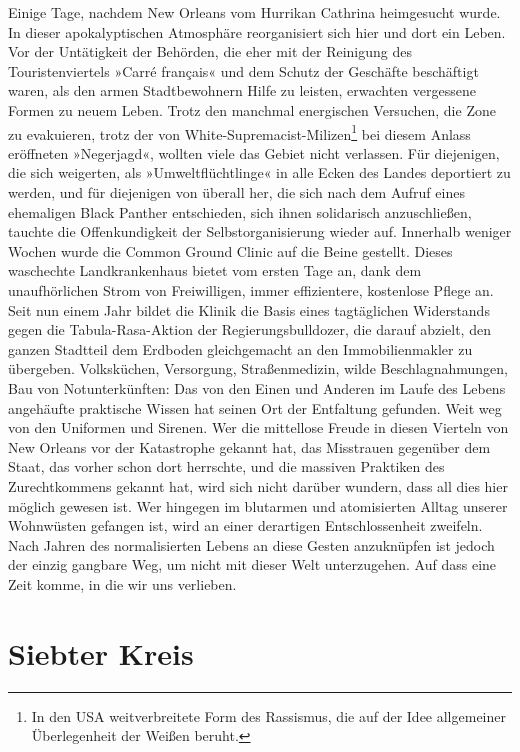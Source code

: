 Einige Tage, nachdem New Orleans vom Hurrikan Cathrina heimgesucht
wurde. In dieser apokalyptischen Atmosphäre reorganisiert sich hier
und dort ein Leben. Vor der Untätigkeit der Behörden, die eher mit
der Reinigung des Touristenviertels »Carré français« und dem Schutz
der Geschäfte beschäftigt waren, als den armen Stadtbewohnern Hilfe
zu leisten, erwachten vergessene Formen zu neuem Leben. Trotz den
manchmal energischen Versuchen, die Zone zu evakuieren, trotz der
von White-Supremacist-Milizen\footnote{
In den USA weitverbreitete Form des Rassismus, die auf der Idee
allgemeiner Überlegenheit der Weißen beruht.
}%
bei diesem Anlass eröffneten
»Negerjagd«, wollten viele das Gebiet nicht verlassen. Für
diejenigen, die sich weigerten, als »Umweltflüchtlinge« in alle
Ecken des Landes deportiert zu werden, und für diejenigen von
überall her, die sich nach dem Aufruf eines ehemaligen Black
Panther entschieden, sich ihnen solidarisch anzuschließen, tauchte
die Offenkundigkeit der Selbstorganisierung wieder auf. Innerhalb
weniger Wochen wurde die Common Ground Clinic auf die Beine
gestellt. Dieses waschechte Landkrankenhaus bietet vom ersten Tage
an, dank dem unaufhörlichen Strom von Freiwilligen, immer
effizientere, kostenlose Pflege an. Seit nun einem Jahr bildet die
Klinik die Basis eines tagtäglichen Widerstands gegen die
Tabula-Rasa-Aktion der Regierungsbulldozer, die darauf abzielt, den
ganzen Stadtteil dem Erdboden gleichgemacht an den Immobilienmakler
zu übergeben. Volksküchen, Versorgung, Straßenmedizin, wilde
Beschlagnahmungen, Bau von Notunterkünften: Das von den Einen und
Anderen im Laufe des Lebens angehäufte praktische Wissen hat seinen
Ort der Entfaltung gefunden. Weit weg von den Uniformen und
Sirenen.
Wer die mittellose Freude in diesen Vierteln von New Orleans vor
der Katastrophe gekannt hat, das Misstrauen gegenüber dem Staat,
das vorher schon dort herrschte, und die massiven Praktiken des
Zurechtkommens gekannt hat, wird sich nicht darüber wundern, dass
all dies hier möglich gewesen ist. Wer hingegen im blutarmen und
atomisierten Alltag unserer Wohnwüsten gefangen ist, wird an einer
derartigen Entschlossenheit zweifeln. Nach Jahren des
normalisierten Lebens an diese Gesten anzuknüpfen ist jedoch der
einzig gangbare Weg, um nicht mit dieser Welt unterzugehen. Auf
dass eine Zeit komme, in die wir uns verlieben.

\section{Siebter Kreis}


